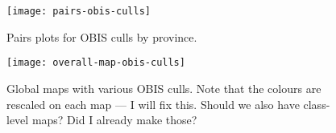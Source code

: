 \documentclass[11pt]{article}
\begin{document}
\clearpage

\begin{figure}[htbp]
\begin{center}
\texttt{[image: pairs-obis-culls]}
\caption{Pairs plots for OBIS culls by province.}
\label{fig:pairs-prov-obis-culls}
\end{center}
\end{figure}

\clearpage

\begin{figure}[htbp]
\begin{center}
\texttt{[image: overall-map-obis-culls]}
\caption{Global maps with various OBIS culls. Note that the colours are rescaled on each map --- I will fix this. Should we also have class-level maps? Did I already make those?}
\label{fig:overall-maps-obis-culls}
\end{center}
\end{figure}
\end{document}
